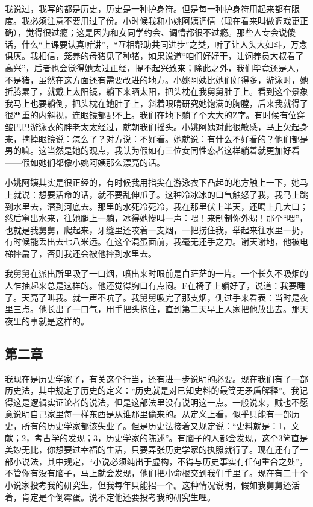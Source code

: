 我说过，我写的都是历史，历史是一种护身符。但是每一种护身符用起来都有限度。我必须注意不要用过了份。小时候我和小姚阿姨调情（现在看来叫做调戏更正确），觉得很过瘾；这是因为和女同学约会、调情都很不过瘾。那些人专会说傻话，什么“上课要认真听讲”，“互相帮助共同进步”之类，听了让人头大如斗，万念俱灰。我相信，笼养的母猪见了种猪，如果说道“咱们好好干，让饲养员大叔看了高兴”，后者也会觉得她太过正经，提不起兴致来；除此之外，我们毕竟还是人，不是猪，虽然在这方面还有需要改进的地方。小姚阿姨比她们好得多，游泳时，她折腾累了，就戴上太阳镜，躺下来晒太阳，把头枕在我舅舅肚子上。看到这个景象我马上也要躺倒，把头枕在她肚子上，斜着眼睛研究她饱满的胸膛，后来我就得了很严重的内斜视，连眼镜都配不上。我们在地下躺了个大大的Z字。有时候有位穿皱巴巴游泳衣的胖老太太经过，就朝我们摇头。小姚阿姨对此很敏感，马上欠起身来，摘掉眼镜说：怎么了？对方说：不好看。她就说：有什么不好看的？他们都是男的嘛。这当然是她的观点，我认为假如有三位女同性恋者这样躺着就更加好看——假如她们都像小姚阿姨那么漂亮的话。 

小姚阿姨其实是很正经的，有时候我用指尖在游泳衣下凸起的地方触上一下，她马上就说：想要活命的话，就不要乱伸爪子。这种冷冰冰的口气触怒了我，我马上跳到水里去，潜到河底去。那里的水死冷死冷，我在那里伏上半天，还喝上几大口；然后窜出水来，往她腿上一躺，冰得她惨叫一声：喂！来制制你外甥！那个“喂”，也就是我舅舅，爬起来，牙缝里还咬着一支烟，一把捞住我，举起来往水里一扔，有时候能丢出去七八米远。在这个混蛋面前，我毫无还手之力。谢天谢地，他被电梯摔扁了，否则我还会被他摔到水里去。 

我舅舅在派出所里吸了一口烟，喷出来时眼前是白茫茫的一片。一个长久不吸烟的人乍抽起来总是这样的。他还觉得胸口有点闷。F在椅子上躺好了，说道：我要睡了。天亮了叫我。就一声不吭了。我舅舅吸完了那支烟，侧过手来看表：当时是夜里三点。他长出了一口气，用手把头抱住，直到第二天早上人家把他放出去。那天夜里的事就是这样的。

\subsection{第二章}

我现在是历史学家了，有关这个行当，还有进一步说明的必要。现在我们有了一部历史法，其中规定了历史的定义：“历史就是对已知史料的最简无矛盾解释”。我记得这是逻辑实证论者的说法，但是这部法里没有说明这一点。一般说来，贼也不愿意说明自己家里每一样东西是从谁那里偷来的。从定义上看，似乎只能有一部历史，所有的历史学家都该失业了。但是历史法接着又规定说：“史料就是：1，文献；2，考古学的发现；3，历史学家的陈述”。有脑子的人都会发现，这个3简直是美妙无比，你想要过幸福的生活，只要弄张历史学家的执照就行了。现在还有了一部小说法，其中规定，“小说必须纯出于虚构，不得与历史事实有任何重合之处”，不管你有没有脑子，马上就会发现，他们把小命根交到我们手里了。现在有二十个小说家投考我的研究生，但我每年只能招一个。这种情况说明，假如我舅舅还活着，肯定是个倒霉蛋。说不定他还要投考我的研究生哩。 

